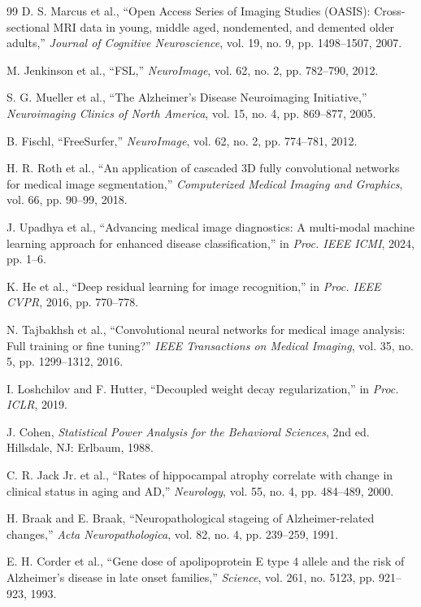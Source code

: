 \documentclass[conference]{IEEEtran}
\begin{document}
\begin{thebibliography}{99}
D. S. Marcus et al., ``Open Access Series of Imaging Studies (OASIS): Cross-sectional MRI data in young, middle aged, nondemented, and demented older adults,'' \textit{Journal of Cognitive Neuroscience}, vol. 19, no. 9, pp. 1498--1507, 2007.

M. Jenkinson et al., ``FSL,'' \textit{NeuroImage}, vol. 62, no. 2, pp. 782--790, 2012.

S. G. Mueller et al., ``The Alzheimer's Disease Neuroimaging Initiative,'' \textit{Neuroimaging Clinics of North America}, vol. 15, no. 4, pp. 869--877, 2005.

B. Fischl, ``FreeSurfer,'' \textit{NeuroImage}, vol. 62, no. 2, pp. 774--781, 2012.

H. R. Roth et al., ``An application of cascaded 3D fully convolutional networks for medical image segmentation,'' \textit{Computerized Medical Imaging and Graphics}, vol. 66, pp. 90--99, 2018.

J. Upadhya et al., ``Advancing medical image diagnostics: A multi-modal machine learning approach for enhanced disease classification,'' in \textit{Proc. IEEE ICMI}, 2024, pp. 1--6.

K. He et al., ``Deep residual learning for image recognition,'' in \textit{Proc. IEEE CVPR}, 2016, pp. 770--778.

N. Tajbakhsh et al., ``Convolutional neural networks for medical image analysis: Full training or fine tuning?'' \textit{IEEE Transactions on Medical Imaging}, vol. 35, no. 5, pp. 1299--1312, 2016.

I. Loshchilov and F. Hutter, ``Decoupled weight decay regularization,'' in \textit{Proc. ICLR}, 2019.

J. Cohen, \textit{Statistical Power Analysis for the Behavioral Sciences}, 2nd ed. Hillsdale, NJ: Erlbaum, 1988.

C. R. Jack Jr. et al., ``Rates of hippocampal atrophy correlate with change in clinical status in aging and AD,'' \textit{Neurology}, vol. 55, no. 4, pp. 484--489, 2000.

H. Braak and E. Braak, ``Neuropathological stageing of Alzheimer-related changes,'' \textit{Acta Neuropathologica}, vol. 82, no. 4, pp. 239--259, 1991.

E. H. Corder et al., ``Gene dose of apolipoprotein E type 4 allele and the risk of Alzheimer's disease in late onset families,'' \textit{Science}, vol. 261, no. 5123, pp. 921--923, 1993.


\end{thebibliography}
\end{document}
